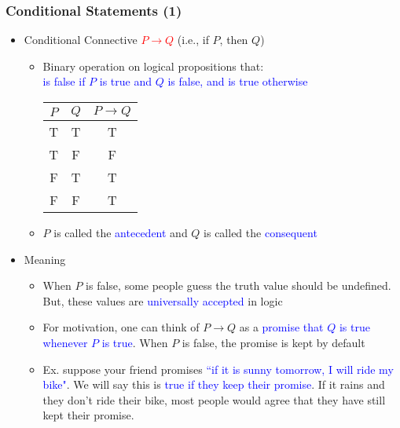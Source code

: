 \documentclass[10pt,english]{beamer}
\begin{document}
\begin{frame} \frametitle{Conditional Statements (1)}

\begin{itemize}

\item Conditional Connective \textcolor{red}{$P \rightarrow Q$} (i.e., if $P$, then $Q$)

\begin{itemize}
  \setlength\itemsep{2mm}
  \item Binary operation on logical propositions that:\\ \hspace{2mm} \textcolor{blue}{is false if $P$ is true and $Q$ is false, and is true otherwise} \\

\begin{center}
\begin{tabular}{|c|c|c|}
\hline
$P$ & $Q$ & $P \rightarrow Q$ \\
\hline
T & T & T \\
T & F & F \\
F & T & T \\
F & F & T \\
\hline
\end{tabular}
\end{center}

\item $P$ is called the \textcolor{blue}{antecedent} and $Q$ is called the \textcolor{blue}{consequent}

\end{itemize}
\vspace{1mm}

\item Meaning

\begin{itemize}
\setlength\itemsep{1.5mm}
\item When $P$ is false, some people guess the truth value should be undefined. But, these values are \textcolor{blue}{universally accepted} in logic

\item For motivation, one can think of $P \rightarrow Q$ as a \textcolor{blue}{promise that $Q$ is true whenever $P$ is true}. When $P$ is false, the promise is kept by default

\item Ex. suppose your friend promises \textcolor{blue}{``if it is sunny tomorrow, I will ride my bike"}.  We will say this is \textcolor{blue}{true if they keep their promise}.
If it rains and they don't ride their bike, most people would agree that they have still kept their promise.

\end{itemize}
\end{itemize}

\end{frame}
\end{document}
